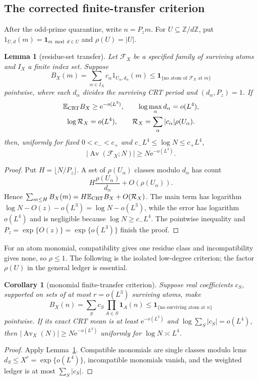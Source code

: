 \documentclass[10pt,reqno]{amsart}
\newtheorem{lemma}[theorem]{Lemma}
\newtheorem{corollary}[theorem]{Corollary}
\theoremstyle{definition}
\newcommand{\Av}{\operatorname {Av}}
\newcommand{\e}{\mathrm e}
\newcommand{\1}{\mathbf 1}
\begin{document}
\subsection{The corrected finite-transfer criterion}
After the odd-prime quarantine, write $n=P_zm$.  For $U\subseteq\mathbb Z/d\mathbb Z$, put $1_{U,d}(m)=\1_{m\bmod d\in U}$ and $\rho(U)=|U|$.
\begin{lemma}[residue-set transfer]\label{lem:residue-transfer}
Let $\mathcal F_X$ be a specified family of surviving atoms and $I_X$ a finite index set.  Suppose
\[
 B_X(m)=\sum_{\alpha\in I_X}c_\alpha1_{U_\alpha,d_\alpha}(m)
 \leq\1_{\{\text{no atom of }\mathcal F_X\text{ at }m\}}
\]
pointwise, where each $d_\alpha$ divides the surviving CRT period and $(d_\alpha,P_z)=1$.  If
\[
 \begin{gathered}
 \mathbb E_{\rm CRT}B_X\geq\e^{-o(L^3)},\qquad
 \log\max_\alpha d_\alpha=o(L^4),\\
 \log\mathcal R_X=o(L^4),\qquad
 \mathcal R_X=\sum_\alpha|c_\alpha|\rho(U_\alpha).
 \end{gathered}
\]
then, uniformly for fixed $0<c_-<c_+$ and
$c_-L^4\leq\log N\leq c_+L^4$,
\[
 |\Av(\mathcal F_X;N)|\geq N\e^{-o(L^3)}.
\]
\end{lemma}
\begin{proof}
Put $H=\lfloor N/P_z\rfloor$.  A set of $\rho(U_\alpha)$ classes modulo $d_\alpha$ has count
\[
 H\frac{\rho(U_\alpha)}{d_\alpha}+O(\rho(U_\alpha)).
\]
Hence
$\sum_{m\leq H}B_X(m)=H\mathbb E_{\rm CRT}B_X+O(\mathcal R_X)$.
The main term has logarithm $\log N-O(z)-o(L^3)=\log N-o(L^3)$, while the error has logarithm $o(L^4)$ and is negligible because $\log N\geq c_-L^4$.  The pointwise inequality and $P_z=\exp\{O(z)\}=\exp\{o(L^3)\}$ finish the proof.
\end{proof}
For an atom monomial, compatibility gives one residue class and incompatibility gives none, so $\rho\leq1$.  The following is the isolated low-degree criterion; the factor $\rho(U)$ in the general ledger is essential.
\begin{corollary}[monomial finite-transfer criterion]\label{cor:monomial-transfer}
Suppose real coefficients $c_S$, supported on sets of at most $r=o(L^3)$ surviving atoms, make
\[
 B_X(n)=\sum_Sc_S\prod_{A\in S}\1_A(n)
 \leq\1_{\{\text{no surviving atom at }n\}}
\]
pointwise.  If its exact CRT mean is at least $\e^{-o(L^3)}$ and
$\log\sum_S|c_S|=o(L^4)$, then
$|\Av_X(N)|\geq N\e^{-o(L^3)}$ uniformly for $\log N\asymp L^4$.
\end{corollary}
\begin{proof}
Apply Lemma~\ref{lem:residue-transfer}.  Compatible monomials are single classes modulo lcms $d_S\leq X^r=\exp\{o(L^4)\}$, incompatible monomials vanish, and the weighted ledger is at most $\sum_S|c_S|$.
\end{proof}
\end{document}
